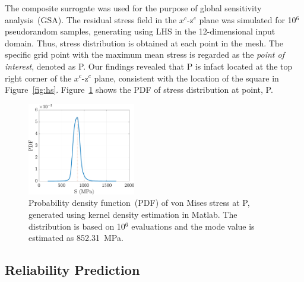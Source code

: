 The composite surrogate was used for the purpose of global sensitivity analysis~(GSA). The residual stress
field in the $x^c$-z$^c$ plane was simulated for 10$^6$ pseudorandom samples, generating using LHS
in the 12-dimensional input domain. Thus, stress distribution is obtained at each point in the mesh. 
The specific grid point with the maximum mean stress is regarded as the \textit{point of interest},
denoted as P. Our findings revealed that P is infact located at the top right corner of the $x^c$-z$^c$
plane, consistent with the location of the square in Figure~\ref{fig:hs}.
Figure~\ref{fig:kde_S} shows the PDF of stress distribution at point, P. 
%
\begin{figure}[htbp]
\begin{center}
\includegraphics[width=0.42\textwidth]{./Figures/kde_S_mumax}
\end{center}
\caption{Probability density function~(PDF) of von Mises stress at P, generated using kernel density estimation in 
Matlab. The distribution is based on 10$^6$ evaluations and the mode value is estimated as 852.31~MPa.}
\label{fig:kde_S}
\end{figure}
%

\subsection{Reliability Prediction}
\label{sub:reliability}

